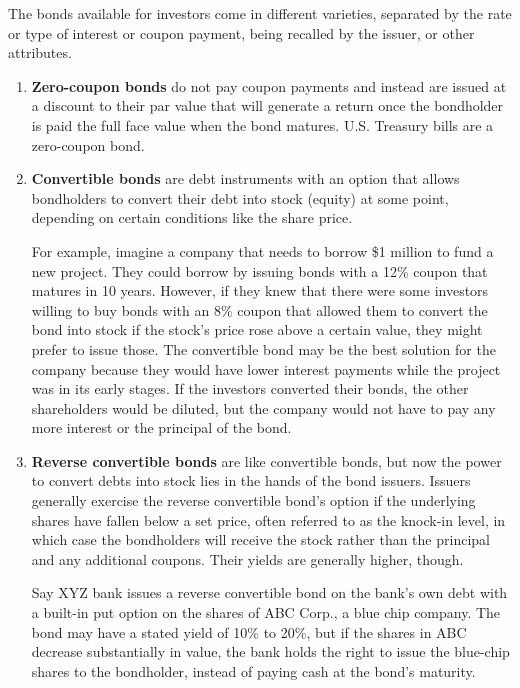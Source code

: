 \documentclass{article}
\begin{document}
    \begin{definition}
      \label{def:extra-properties-of-bonds}
      The bonds available for investors come in different varieties, separated by the rate or type of interest or coupon payment, being recalled by the issuer, or other attributes. 
      \begin{enumerate}
        \item \textbf{Zero-coupon bonds} do not pay coupon payments and instead are issued at a discount to their par value that will generate a return once the bondholder is paid the full face value when the bond matures. U.S. Treasury bills are a zero-coupon bond. 
        \item \textbf{Convertible bonds} are debt instruments with an option that allows bondholders to convert their debt into stock (equity) at some point, depending on certain conditions like the share price. 
        
        For example, imagine a company that needs to borrow \$1 million to fund a new project. They could borrow by issuing bonds with a 12\% coupon that matures in 10 years. However, if they knew that there were some investors willing to buy bonds with an 8\% coupon that allowed them to convert the bond into stock if the stock’s price rose above a certain value, they might prefer to issue those. The convertible bond may be the best solution for the company because they would have lower interest payments while the project was in its early stages. If the investors converted their bonds, the other shareholders would be diluted, but the company would not have to pay any more interest or the principal of the bond. 
        
        \item \textbf{Reverse convertible bonds} are like convertible bonds, but now the power to convert debts into stock lies in the hands of the bond issuers. Issuers generally exercise the reverse convertible bond's option if the underlying shares have fallen below a set price, often referred to as the knock-in level, in which case the bondholders will receive the stock rather than the principal and any additional coupons. Their yields are generally higher, though. 
        
        Say XYZ bank issues a reverse convertible bond on the bank's own debt with a built-in put option on the shares of ABC Corp., a blue chip company. The bond may have a stated yield of 10\% to 20\%, but if the shares in ABC decrease substantially in value, the bank holds the right to issue the blue-chip shares to the bondholder, instead of paying cash at the bond's maturity.
        

\end{enumerate}
\end{definition}
\end{document}

